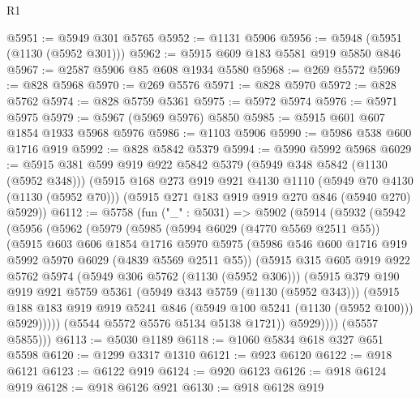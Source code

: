 \begin{lexlean}{R1}
\begin{coremodule}
@5951 := @5949 @301 @5765
@5952 := @1131 @5906
@5956 := @5948 (@5951 (@1130 (@5952 @301)))
@5962 := @5915 @609 @183 @5581 @919 @5850 @846
@5967 := @2587 @5906 @85 @608 @1934 @5580
@5968 := @269 @5572
@5969 := @828 @5968
@5970 := @269 @5576
@5971 := @828 @5970
@5972 := @828 @5762
@5974 := @828 @5759 @5361
@5975 := @5972 @5974
@5976 := @5971 @5975
@5979 := @5967 (@5969 @5976) @5850
@5985 := @5915 @601 @607 @1854 @1933 @5968 @5976
@5986 := @1103 @5906
@5990 := @5986 @538 @600 @1716 @919
@5992 := @828 @5842 @5379
@5994 := @5990 @5992 @5968
@6029 := @5915
    @381
    @599
    @919
    @922
    @5842
    @5379
    (@5949 @348 @5842 (@1130 (@5952 @348)))
    (@5915
      @168
      @273
      @919
      @921
      @4130
      @1110
      (@5949 @70 @4130 (@1130 (@5952 @70)))
      (@5915 @271 @183 @919 @919 @270 @846 (@5940 @270) @5929))
@6112 := @5758
    (fun ("_" : @5031) =>
    @5902
      (@5914
        (@5932
          (@5942
            (@5956
              (@5962
                (@5979
                  (@5985
                    (@5994 @6029 (@4770 @5569 @2511 @55))
                    (@5915
                      @603
                      @606
                      @1854
                      @1716
                      @5970
                      @5975
                      (@5986 @546 @600 @1716 @919 @5992 @5970 @6029 (@4839 @5569 @2511 @55))
                      (@5915
                        @315
                        @605
                        @919
                        @922
                        @5762
                        @5974
                        (@5949 @306 @5762 (@1130 (@5952 @306)))
                        (@5915
                          @379
                          @190
                          @919
                          @921
                          @5759
                          @5361
                          (@5949 @343 @5759 (@1130 (@5952 @343)))
                          (@5915
                            @188
                            @183
                            @919
                            @919
                            @5241
                            @846
                            (@5949 @100 @5241 (@1130 (@5952 @100)))
                            @5929)))))
                  (@5544 @5572 @5576 @5134 @5138 @1721))
                @5929))))
        (@5557 @5855)))
@6113 := @5030 @1189
@6118 := @1060 @5834 @618 @327 @651 @5598
@6120 := @1299 @3317 @1310
@6121 := @923 @6120
@6122 := @918 @6121
@6123 := @6122 @919
@6124 := @920 @6123
@6126 := @918 @6124 @919
@6128 := @918 @6126 @921
@6130 := @918 @6128 @919

\end{coremodule}
\end{lexlean}
